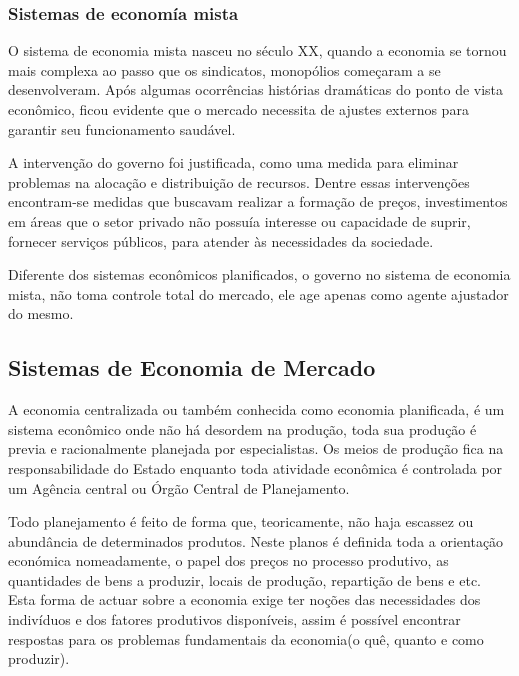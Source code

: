 \subsubsection{Sistemas de economía mista}
O sistema de economia mista nasceu no século XX, quando a economia se tornou mais complexa ao passo que os sindicatos, monopólios começaram a se desenvolveram. Após algumas ocorrências histórias dramáticas do ponto de vista econômico, ficou evidente que o mercado necessita de ajustes externos para garantir seu funcionamento saudável.\par
A intervenção do governo foi justificada, como uma medida para eliminar problemas na alocação e distribuição de recursos. Dentre essas intervenções encontram-se medidas que buscavam realizar a formação de preços, investimentos em áreas que o setor privado não possuía interesse ou capacidade de suprir, fornecer serviços públicos, para atender às necessidades da sociedade.\par
Diferente dos sistemas econômicos planificados, o governo no sistema de economia mista, não toma controle total do mercado, ele age apenas como agente ajustador do mesmo.\par
\subsection{Sistemas de Economia de Mercado}
A economia centralizada ou também conhecida como economia planificada, é um sistema econômico onde não há desordem na produção, toda sua produção é previa e racionalmente planejada por especialistas. Os meios de produção fica na responsabilidade do Estado enquanto toda atividade econômica é controlada por um Agência central ou Órgão Central de Planejamento.\par
Todo planejamento é feito de forma que, teoricamente, não haja escassez ou abundância de determinados produtos. Neste planos é definida toda a orientação económica nomeadamente, o papel dos preços no processo produtivo, as quantidades de bens a produzir, locais de produção, repartição de bens e etc. Esta forma de actuar sobre a economia exige ter noções das necessidades dos indivíduos  e dos fatores produtivos disponíveis, assim é possível encontrar respostas para os problemas fundamentais da economia(o quê, quanto e como produzir).\par
\clearpage